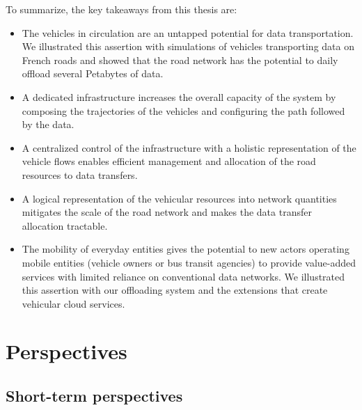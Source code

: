 To summarize, the key takeaways from this thesis are:
\begin{itemize}

    \item The vehicles in circulation are an untapped potential for data transportation. We illustrated this assertion with simulations of vehicles transporting data on French roads and showed that the road network has the potential to daily offload several Petabytes of data.
    
    \item A dedicated infrastructure increases the overall capacity of the system by composing the trajectories of the vehicles and configuring the path followed by the data.

    \item A centralized control of the infrastructure with a holistic representation of the vehicle flows enables efficient management and allocation of the road resources to data transfers.
    
    \item A logical representation of the vehicular resources into network quantities mitigates the scale of the road network and makes the data transfer allocation tractable. 
    
    \item The mobility of everyday entities gives the potential to new actors operating mobile entities (\eg vehicle owners or bus transit agencies) to provide value-added services with limited reliance on conventional data networks. We illustrated this assertion with our offloading system and the extensions that create vehicular cloud services.
    
\end{itemize}

\section{Perspectives}

\subsection{Short-term perspectives}

